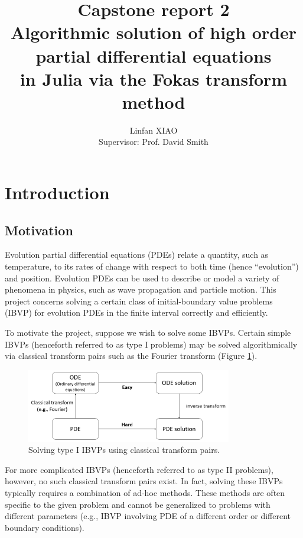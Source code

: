 \documentclass[11pt, oneside, a4paper]{article}
\author{Linfan XIAO\\
Supervisor: Prof. David Smith}
\title{Capstone report 2\\
Algorithmic solution of high order partial differential equations\\
in Julia via the Fokas transform method}
\date{\vspace{-5ex}}
\begin{document}
\maketitle

\thispagestyle{fancy}

\tableofcontents
\newpage
\section{Introduction}
\subsection{Motivation}
Evolution partial differential equations (PDEs) relate a quantity, such as temperature, to its rates of change with respect to both time (hence ``evolution'') and position. Evolution PDEs can be used to describe or model a variety of phenomena in physics, such as wave propagation and particle motion. This project concerns solving a certain class of initial-boundary value problems (IBVP) for evolution PDEs in the finite interval\cite{Smith2016} correctly and efficiently. 

To motivate the project, suppose we wish to solve some IBVPs.
Certain simple IBVPs (henceforth referred to as type I problems) may be solved algorithmically via classical transform pairs such as the Fourier transform (Figure \ref{fig:classical_transform}).
\begin{figure}[htpb!]
    \centering
    \includegraphics[width=0.8\textwidth]{classical_transform.png}
    \caption{Solving type I IBVPs using classical transform pairs.}
    \label{fig:classical_transform}
\end{figure}

For more complicated IBVPs (henceforth referred to as type II problems), however, no such classical transform pairs exist. In fact, solving these IBVPs typically requires a combination of ad-hoc methods. These methods are often specific to the given problem and cannot be generalized to problems with different parameters (e.g., IBVP involving PDE of a different order or different boundary conditions). %
\end{document}
